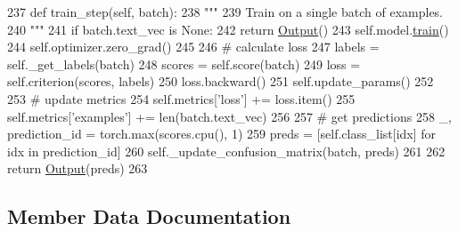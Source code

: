 \begin{DoxyCode}
237     \textcolor{keyword}{def }train\_step(self, batch):
238         \textcolor{stringliteral}{"""}
239 \textcolor{stringliteral}{        Train on a single batch of examples.}
240 \textcolor{stringliteral}{        """}
241         \textcolor{keywordflow}{if} batch.text\_vec \textcolor{keywordflow}{is} \textcolor{keywordtype}{None}:
242             \textcolor{keywordflow}{return} \hyperlink{namespaceparlai_1_1agents_1_1legacy__agents_1_1seq2seq_1_1torch__agent__v1_a2689006ea97d09413fb242f984bd8016}{Output}()
243         self.model.\hyperlink{namespaceprojects_1_1mastering__the__dungeon_1_1mturk_1_1tasks_1_1MTD_1_1run_a36a5f4f6f9df0611a6818610518d2cf0}{train}()
244         self.optimizer.zero\_grad()
245 
246         \textcolor{comment}{# calculate loss}
247         labels = self.\_get\_labels(batch)
248         scores = self.score(batch)
249         loss = self.criterion(scores, labels)
250         loss.backward()
251         self.update\_params()
252 
253         \textcolor{comment}{# update metrics}
254         self.metrics[\textcolor{stringliteral}{'loss'}] += loss.item()
255         self.metrics[\textcolor{stringliteral}{'examples'}] += len(batch.text\_vec)
256 
257         \textcolor{comment}{# get predictions}
258         \_, prediction\_id = torch.max(scores.cpu(), 1)
259         preds = [self.class\_list[idx] \textcolor{keywordflow}{for} idx \textcolor{keywordflow}{in} prediction\_id]
260         self.\_update\_confusion\_matrix(batch, preds)
261 
262         \textcolor{keywordflow}{return} \hyperlink{namespaceparlai_1_1agents_1_1legacy__agents_1_1seq2seq_1_1torch__agent__v1_a2689006ea97d09413fb242f984bd8016}{Output}(preds)
263 
\end{DoxyCode}


\subsection{Member Data Documentation}
\mbox{\label{classparlai_1_1core_1_1torch__classifier__agent_1_1TorchClassifierAgent_a80b1b3e0162c2dca36a1e1763cf3cad9}} 
